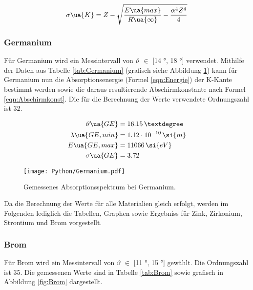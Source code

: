 \begin{equation}
  \sigma\ua{K} = Z - \sqrt{ \frac{E\ua{max}}{R\ua{\infty}} - \frac{\alpha^4 Z^4}{4}}
  \label{eqn:Abschirmkonst}
\end{equation}


\subsubsection{Germanium}

Für Germanium wird ein Messintervall von $\vartheta$ $\in$ [14 °, 18 °] verwendet.
Mithilfe der Daten aus Tabelle \ref{tab:Germanium} (grafisch siehe Abbildung
\ref{fig:Germanium})
kann für Germanium nun die Absorptionsenergie (Formel \eqref{eqn:Energie})
der K-Kante bestimmt werden sowie
die daraus resultierende Abschirmkonstante nach Formel \eqref{eqn:Abschirmkonst}.
Die für die Berechnung
der Werte verwendete Ordnungszahl ist 32.

\begin{align*}
  \vartheta\ua{GE} &= 16.15 \, ° \\
  \lambda\ua{GE,min} &= 1.12 \cdot 10^{-10} \, \si{m} \\
  E\ua{GE,max} &= 11066 \, \si{eV} \\
  \sigma\ua{GE} &= 3.72
\end{align*}

\begin{figure}
  \centering
  \texttt{[image: Python/Germanium.pdf]}
  \caption{Gemessenes Absorptionsspektrum bei Germanium.}
  \label{fig:Germanium}
\end{figure}




Da die Berechnung der Werte für alle Materialien gleich erfolgt, werden im Folgenden
lediglich die Tabellen, Graphen sowie Ergebniss für Zink, Zirkonium, Strontium und
Brom vorgestellt.

\newpage %

\subsubsection{Brom}

Für Brom wird ein Messintervall von $\vartheta$ $\in$ [11 °, 15 °] gewählt.
Die Ordnungszahl ist 35. Die gemessenen Werte sind in Tabelle \ref{tab:Brom}
sowie grafisch in Abbildung \ref{fig:Brom} dargestellt.

